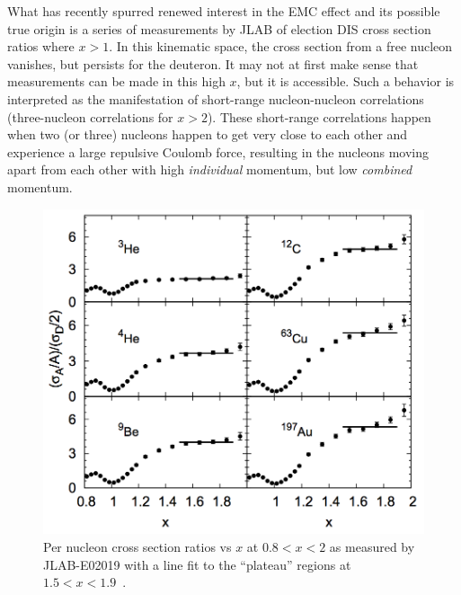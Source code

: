 What has recently spurred renewed interest in the EMC effect and its possible true origin is a series of measurements by JLAB of election DIS cross section ratios where $x>1$. In this kinematic space, the cross section from a free nucleon vanishes, but persists for the deuteron. It may not at first make sense that measurements can be made in this high $x$, but it is accessible. Such a behavior is interpreted as the manifestation of short-range nucleon-nucleon correlations (three-nucleon correlations for $x>2$). These short-range correlations happen when two (or three) nucleons happen to get very close to each other and experience a large repulsive Coulomb force, resulting in the nucleons moving apart from each other with high \emph{individual} momentum, but low \emph{combined} momentum.

\begin{figure}[!tbp]
	\centering
	\begin{minipage}[b]{.4\textwidth}
		\centering
		\includegraphics[height=0.3\textheight]{figures/background/nn-src-plateau.png}
		\caption{Per nucleon cross section ratios vs $x$ at $0.8<x<2$ as measured by JLAB-E02019 with a line fit to the ``plateau'' regions at $1.5<x<1.9$~\cite{Fomin:2011ng}.}
		\label{fig:nn-src-plateau}
	\end{minipage}%
	\hfill
	\begin{minipage}[b]{.4\textwidth}
		\centering

\end{minipage}
\end{figure}
